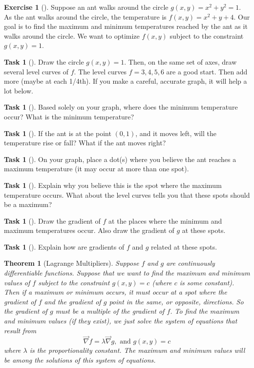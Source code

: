 \documentclass[10pt,]{book}
\theoremstyle{plain}
\newtheorem{theorem}{Theorem}[section]
\theoremstyle{definition}
\theoremstyle{definition}
\theoremstyle{definition}
\theoremstyle{definition}
\newtheorem{exploration}[project]{Exercise}
\newtheorem{task}[project]{Task}
\theoremstyle{definition}
\numberwithin{equation}{section}
\begin{document}
\begin{exploration}[]\label{exploration-241}
Suppose an ant walks around the circle \(g(x,y)=x^2+y^2=1\). As the ant walks around the circle, the temperature is \(f(x,y) = x^2+y+4\). Our goal is to find the maximum and minimum temperatures reached by the ant as it walks around the circle. We want to optimize \(f(x,y)\) subject to the constraint \(g(x,y)=1\).%
\begin{task}[]\label{task-650}
Draw the circle \(g(x,y)=1\).  Then, on the same set of axes, draw several level curves of \(f\). The level curves \(f=3, 4, 5, 6\) are a good start. Then add more (maybe at each 1/4th). If you make a careful, accurate graph, it will help a lot below.%
\end{task}
\begin{task}[]\label{task-651}
Based solely on your graph, where does the minimum temperature occur?  What is the minimum temperature?%
\end{task}
\begin{task}[]\label{task-652}
If the ant is at the point \((0,1)\), and it moves left, will the temperature rise or fall?  What if the ant moves right?%
\end{task}
\begin{task}[]\label{task-653}
On your graph, place a dot(s) where you believe the ant reaches a maximum temperature (it may occur at more than one spot).%
\end{task}
\begin{task}[]\label{task-654}
Explain why you believe this is the spot where the maximum temperature occurs. What about the level curves tells you that these spots should be a maximum?%
\end{task}
\begin{task}[]\label{task-655}
Draw the gradient of \(f\) at the places where the minimum and maximum temperatures occur. Also draw the gradient of \(g\) at these spots.%
\end{task}
\begin{task}[]\label{task-656}
Explain how are gradients of \(f\) and \(g\) related at these spots.%
\end{task}
\end{exploration}
\begin{theorem}[{Lagrange Multipliers}]\label{theorem-9}
Suppose \(f\) and \(g\) are continuously differentiable functions. Suppose that we want to find the maximum and minimum values of \(f\) subject to the constraint \(g(x,y)=c\) (where \(c\) is some constant). Then if a maximum or minimum occurs, it must occur at a spot where the gradient of \(f\) and the gradient of \(g\) point in the same, or opposite, directions. So the gradient of \(g\) must be a multiple of the gradient of \(f\). To find the maximum and minimum values (if they exist), we just solve the system of equations that result from%
\begin{equation*}
\vec \nabla f = \lambda \vec \nabla g, \text{ and }  g(x,y)=c
\end{equation*}
where \(\lambda\) is the proportionality constant. The maximum and minimum values will be among the solutions of this system of equations.%
\end{theorem}
\end{document}
